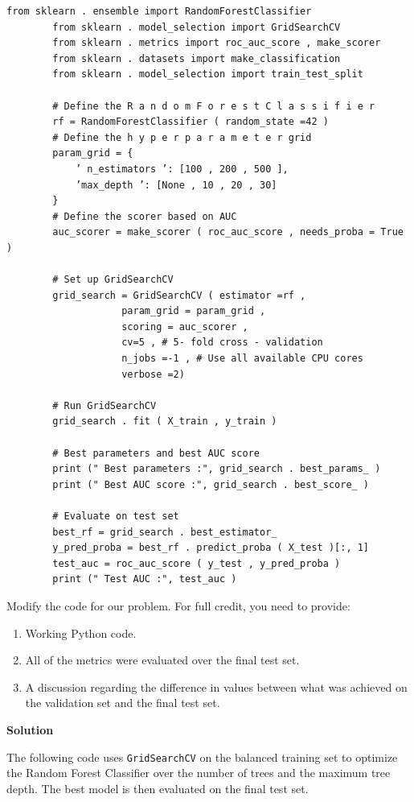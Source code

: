 \documentclass[11pt]{article}
\begin{document}
	\begin{lstlisting}[style=matlabstyle]
		from sklearn . ensemble import RandomForestClassifier
		from sklearn . model_selection import GridSearchCV
		from sklearn . metrics import roc_auc_score , make_scorer
		from sklearn . datasets import make_classification
		from sklearn . model_selection import train_test_split
		
		# Define the R a n d o m F o r e s t C l a s s i f i e r
		rf = RandomForestClassifier ( random_state =42 )
		# Define the h y p e r p a r a m e t e r grid
		param_grid = {
			’ n_estimators ’: [100 , 200 , 500 ],
			’max_depth ’: [None , 10 , 20 , 30]
		}
		# Define the scorer based on AUC
		auc_scorer = make_scorer ( roc_auc_score , needs_proba = True )
		
		# Set up GridSearchCV
		grid_search = GridSearchCV ( estimator =rf ,
					param_grid = param_grid ,
					scoring = auc_scorer ,
					cv=5 , # 5- fold cross - validation
					n_jobs =-1 , # Use all available CPU cores
					verbose =2)
					
		# Run GridSearchCV
		grid_search . fit ( X_train , y_train )
		
		# Best parameters and best AUC score
		print (" Best parameters :", grid_search . best_params_ )
		print (" Best AUC score :", grid_search . best_score_ )
		
		# Evaluate on test set
		best_rf = grid_search . best_estimator_
		y_pred_proba = best_rf . predict_proba ( X_test )[:, 1]
		test_auc = roc_auc_score ( y_test , y_pred_proba )
		print (" Test AUC :", test_auc )
	\end{lstlisting}
	
	Modify the code for our problem. For full credit, you need to provide:
	
	\begin{enumerate}[label=\roman*.]
		\item Working Python code.
		\item All of the metrics were evaluated over the final test set.
		\item A discussion regarding the difference in values between what was achieved on the validation set and the final
		test set.
	\end{enumerate}
	
	\textbf{Solution}
	
	The following code uses \texttt{GridSearchCV} on the balanced training set to optimize the Random Forest Classifier over the number of trees and the maximum tree depth. The best model is then evaluated on the final test set.
	
\end{document}
